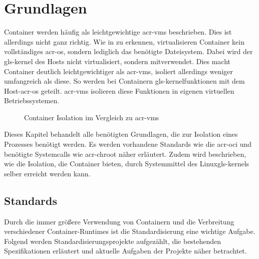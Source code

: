 \chapter{Grundlagen}
\label{chap:grundlagen}
Container werden häufig als leichtgewichtige \glspl{acr-vm} beschrieben. Dies ist allerdings nicht ganz richtig. Wie in  zu erkennen, virtualisieren Container kein vollständiges \gls{acr-os}, sondern lediglich das benötigte Dateisystem. Dabei wird der \gls{gls-kernel} des Hosts nicht virtualisiert, sondern mitverwendet. Dies macht Container deutlich leichtgewichtiger als \glspl{acr-vm}, isoliert allerdings weniger umfangreich als diese. So werden bei Containern \gls{gls-kernel}funktionen mit dem Host-\gls{acr-os} geteilt. \glspl{acr-vm} isolieren diese Funktionen in eigenen virtuellen Betriebssystemen.
\begin{figure}[h]
		\hfill
		\caption{Container Isolation im Vergleich zu \glspl{acr-vm}}
		\label{fig:containerVsVm}
\end{figure}

Dieses Kapitel behandelt alle benötigten Grundlagen, die zur Isolation eines Prozesses benötigt werden. Es werden vorhandene Standards wie die \gls{acr-oci} und benötigte Systemcalls wie \gls{acr-chroot} näher erläutert. Zudem wird beschrieben, wie die Isolation, die Container bieten, durch Systemmittel des Linux\glspl{gls-kernel} selber erreicht werden kann.
\section{Standards}
\label{sec:standards}
Durch die immer größere Verwendung von Containern und die Verbreitung verschiedener Container-Runtimes ist die Standardisierung eine wichtige Aufgabe. Folgend werden Standardisierungsprojekte aufgezählt, die bestehenden Spezifikationen erläutert und aktuelle Aufgaben der Projekte näher betrachtet.
